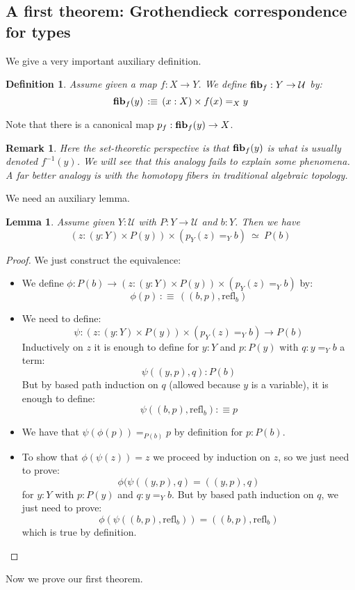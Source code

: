 \documentclass{article}
\newcommand{\sse}[1]{\medbreak \subsection{#1}}
\newcommand{\U}{{\mathcal U}}
\renewcommand{\r}{\rightarrow}
\newcommand{\refl}{\mathrm{refl}}
\newcommand{\fib}{\mathrm{\bf fib}}
\newtheorem{lemma}{Lemma}
\newtheorem{definition}{Definition}
\newtheorem{remark}{Remark}
\begin{document}
\sse{A first theorem: Grothendieck correspondence for types}

We give a very important auxiliary definition.

\begin{definition}
Assume given a map $f:X\r Y$. We define $\fib_f : Y\r \U$ by:
\[\fib_f(y) \, :\equiv \, (x:X)\times f(x) =_X y\]
\end{definition}

Note that there is a canonical map $p_f:\fib_f(y) \r X$.

\begin{remark}
Here the set-theoretic perspective is that $\fib_f(y)$ is what is usually denoted $f^{-1}(y)$. We will see that this analogy fails to explain some phenomena. A far better analogy is with the \emph{homotopy fibers} in traditional algebraic topology. %
\end{remark}


We need an auxiliary lemma.

\begin{lemma}
Assume given $Y:\U$ with $P:Y\r \U$ and $b:Y$. Then we have
\[(z:(y:Y)\times P(y))\times (p_Y(z) =_Y b) \ \simeq \ P(b)\]
\end{lemma}
\begin{proof}
We just construct the equivalence:
\begin{itemize}
\item We define $\phi : P(b) \r (z:(y:Y)\times P(y))\times (p_Y(z) =_Y b)$ by:
\[\phi(p) \, :\equiv\, ((b,p),\refl_b)\]
\item We need to define: 
\[\psi : (z:(y:Y)\times P(y))\times (p_Y(z) =_Y b) \r P(b)\] 
Inductively on $z$ it is enough to define for $y:Y$ and $p:P(y)$ with $q:y=_Y b$ a term:
\[\psi((y,p),q) : P(b)\]
But by based path induction on $q$ (allowed because $y$ is a variable), it is enough to define:
\[\psi((b,p),\refl_b) :\equiv p\]
\item We have that $\psi(\phi(p)) =_{P(b)} p$ by definition for $p:P(b)$.
\item To show that $\phi(\psi(z)) = z$ we proceed by induction on $z$, so we just need to prove:
\[\phi(\psi((y,p),q) = ((y,p),q)\]
for $y:Y$ with $p:P(y)$ and $q:y=_Y b$. But by based path induction on $q$, we just need to prove:
\[\phi(\psi((b,p),\refl_b)) = ((b,p),\refl_b)\]
which is true by definition.
\end{itemize}
\end{proof}

Now we prove our first theorem.
\end{document}
